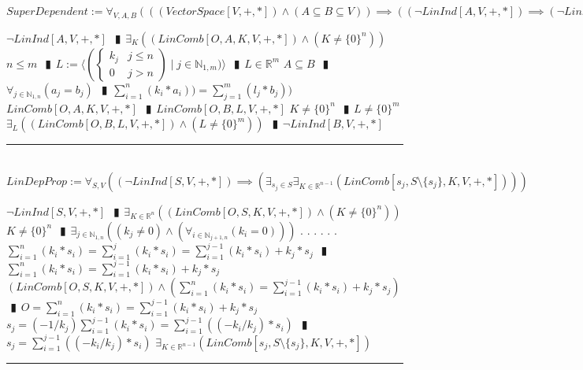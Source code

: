 \documentclass{book}
\newcommand{\abr}{:=}
\newcommand{\cont}{\phantom{.}. . .\phantom{.}}
\newcommand{\pipe}{$\phantom{(}\vrectangleblack\phantom{)}$}
\newcommand{\st}{\mathbin{|}}
\begin{document}
$SuperDependent \abr \forall_{V, A, B}(((VectorSpace[V, +, *]) \land (A \subseteq B \subseteq V)) \implies ((\lnot LinInd[A, V, +, *]) \implies (\lnot LinInd[B, V, +, *])))$
\begin{enumerate}
  \lit $\lnot LinInd[A, V, +, *]$ \pipe $\exists_{K}((LinComb[O, A, K, V, +, *]) \land (K \neq \{0\}^n))$
  \lit $n \leq m$ \pipe $L \abr \langle \left(\begin{cases} 
      k_j & j \leq n \\
      0 & j > n 
    \end{cases}\right) \st j \in \mathbb{N}_{1, m}) \rangle$ \pipe $L \in \mathbb{R}^m$
  \lit $A \subseteq B$ \pipe $\forall_{j \in \mathbb{N}_{1, n}}(a_j = b_j)$ \pipe $\sum_{i = 1}^{n}(k_i * a_i)) = \sum_{j = 1}^{m}(l_j * b_j))$
  \lit $LinComb[O, A, K, V, +, *]$ \pipe $LinComb[O, B, L, V, +, *]$
  \lit $K \neq \{0\}^n$ \pipe $L \neq \{0\}^m$
  \lit $\exists_{L}((LinComb[O, B, L, V, +, *]) \land (L \neq \{0\}^m))$ \pipe $\lnot LinInd[B, V, +, *]$
\end{enumerate} \vspace{.75mm} \hrule \vspace{.75mm} \ \\ 

$LinDepProp \abr \forall_{S, V}((\lnot LinInd[S, V, +, *]) \implies (\exists_{s_j \in S} \exists_{K \in \mathbb{R}^{n - 1}}(LinComb[s_j, S \setminus \{s_j\}, K, V, +, *])))$
\begin{enumerate}
  \lit $\lnot LinInd[S, V, +, *]$ \pipe $\exists_{K \in \mathbb{R}^n}((LinComb[O, S, K, V, +, *]) \land (K \neq \{0\}^n))$
  \lit $K \neq \{0\}^n$ \pipe $\exists_{j \in \mathbb{N}_{1, n}}((k_j \neq 0) \land (\forall_{i \in \mathbb{N}_{j + 1, n}}(k_i = 0)))$ \cont
  \lit \cont $\sum_{i = 1}^{n}(k_i * s_i) = \sum_{i = 1}^{j}(k_i * s_i) = \sum_{i = 1}^{j - 1}(k_i * s_i) + k_j * s_j$ \pipe $\sum_{i = 1}^{n}(k_i * s_i) = \sum_{i = 1}^{j - 1}(k_i * s_i) + k_j * s_j$
  \lit $(LinComb[O, S, K, V, +, *]) \land (\sum_{i = 1}^{n}(k_i * s_i) = \sum_{i = 1}^{j - 1}(k_i * s_i) + k_j * s_j)$ \pipe $O = \sum_{i = 1}^{n}(k_i * s_i) = \sum_{i = 1}^{j - 1}(k_i * s_i) + k_j * s_j$
  \lit $s_j = (-1/k_j) \sum_{i = 1}^{j - 1}(k_i * s_i) = \sum_{i = 1}^{j - 1}((-k_i / k_j) * s_i)$ \pipe $s_j = \sum_{i = 1}^{j - 1}((-k_i / k_j) * s_i)$
  \lit $\exists_{K \in \mathbb{R}^{n - 1}}(LinComb[s_j, S \setminus \{s_j\}, K, V, +, *])$
\end{enumerate} \vspace{.75mm} \hrule \vspace{.75mm} \ \\ 
\end{document}
